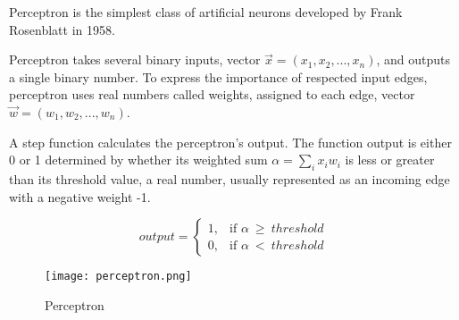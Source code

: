 Perceptron is the simplest class of artificial neurons developed by Frank Rosenblatt in 1958.\cite{perceptronprobabmodel}

Perceptron takes several binary inputs, vector $\vec{x} = (x_1, x_2,...,x_n)$, and outputs a single binary number. To express the importance of respected input edges, perceptron uses real numbers called weights, assigned to each edge, vector $\vec{w} = (w_1,w_2,...,w_n)$.

A step function calculates the perceptron's output.
The function output is either 0 or 1 determined by whether its weighted sum $\alpha = \sum_{i} x_i w_i$ is less or greater than its threshold value, a real number, usually represented as an incoming edge with a negative weight -1.

\begin{equation}
    output =
\begin{cases}
    1, & \text{if $\alpha\ \geq\ threshold$}\\
    0, & \text{if $\alpha\ <\ threshold$}
\end{cases} 
\end{equation} 


\begin{figure}[h]
	\centering
    \texttt{[image: perceptron.png]}
	\caption{Perceptron \cite{matous}}
	\label{fig:perceptron}
\end{figure}
